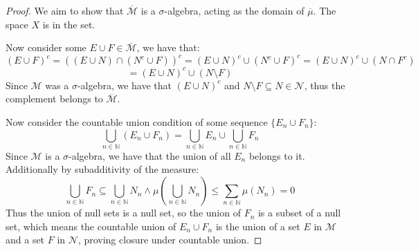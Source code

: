 \documentclass[10pt,letterpaper]{article} %
\begin{document}
\begin{proof}
We aim to show that $\overline{\mathcal{M}}$ is a $\sigma$-algebra, acting as the domain of $\overline{\mu}$. The space $X$ is in the set.

Now consider some $E \cup F \in \overline{\mathcal{M}}$, we have that:
\begin{equation*}
(E \cup F)^c = ((E \cup N) \cap (N^c \cup F))^c = (E \cup N)^c \cup (N^c \cup F)^c = (E \cup N)^c \cup (N \cap F^c)
\end{equation*}
\begin{equation*}
= (E \cup N)^c \cup (N \setminus F)
\end{equation*}
Since $\mathcal{M}$ was a $\sigma$-algebra, we have that $(E \cup N)^c$ and $N \setminus F \subseteq N \in \mathcal{N}$, thus the complement belongs to $\overline{\mathcal{M}}$. 

Now consider the countable union condition of some sequence $\{E_n \cup F_n\}$:
\begin{equation*}
\bigcup_{n \in \mathbb{N}}(E_n \cup F_n) = \bigcup_{n \in \mathbb{N}}E_n \cup \bigcup_{n \in \mathbb{N}}F_n
\end{equation*}
Since $\mathcal{M}$ is a $\sigma$-algebra, we have that the union of all $E_n$ belongs to it. Additionally by subadditivity of the measure:
\begin{equation*}
\bigcup_{n \in \mathbb{N}}F_n \subseteq \bigcup_{n \in \mathbb{N}}N_n \land \mu\left(\bigcup_{n \in \mathbb{N}}N_n\right) \leqslant \sum_{n \in \mathbb{N}}\mu(N_n) = 0
\end{equation*}
Thus the union of null sets is a null set, so the union of $F_n$ is a subset of a null set, which means the countable union of $E_n \cup F_n$ is the union of a set $E$ in $\mathcal{M}$ and a set $F$ in $\mathcal{N}$,
proving closure under countable union.


\end{proof}
\end{document}

